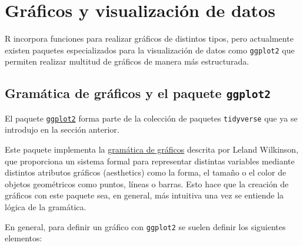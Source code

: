 \documentclass[
  a4paper,
]{scrreport}
\theoremstyle{definition}
\theoremstyle{definition}
\theoremstyle{remark}
\begin{document}
\hypertarget{gruxe1ficos-y-visualizaciuxf3n-de-datos}{%
\chapter{Gráficos y visualización de
datos}\label{gruxe1ficos-y-visualizaciuxf3n-de-datos}}

R incorpora funciones para realizar gráficos de distintos tipos, pero
actualmente existen paquetes especializados para la visualización de
datos como \texttt{ggplot2} que permiten realizar multitud de gráficos
de manera más estructurada.

\hypertarget{gramuxe1tica-de-gruxe1ficos-y-el-paquete-ggplot2}{%
\section{\texorpdfstring{Gramática de gráficos y el paquete
\texttt{ggplot2}}{Gramática de gráficos y el paquete ggplot2}}\label{gramuxe1tica-de-gruxe1ficos-y-el-paquete-ggplot2}}

El paquete \href{https://ggplot2.tidyverse.org/}{\texttt{ggplot2}} forma
parte de la colección de paquetes \texttt{tidyverse} que ya se introdujo
en la sección anterior.

Este paquete implementa la
\href{https://www.academia.edu/54823545/The_grammar_of_graphics}{gramática
de gráficos} descrita por Leland Wilkinson, que proporciona un sistema
formal para representar distintas variables mediante distintos atributos
gráficos (aesthetics) como la forma, el tamaño o el color de objetos
geométricos como puntos, líneas o barras. Esto hace que la creación de
gráficos con este paquete sea, en general, más intuitiva una vez se
entiende la lógica de la gramática.

En general, para definir un gráfico con \texttt{ggplot2} se suelen
definir los siguientes elementos:
\end{document}
